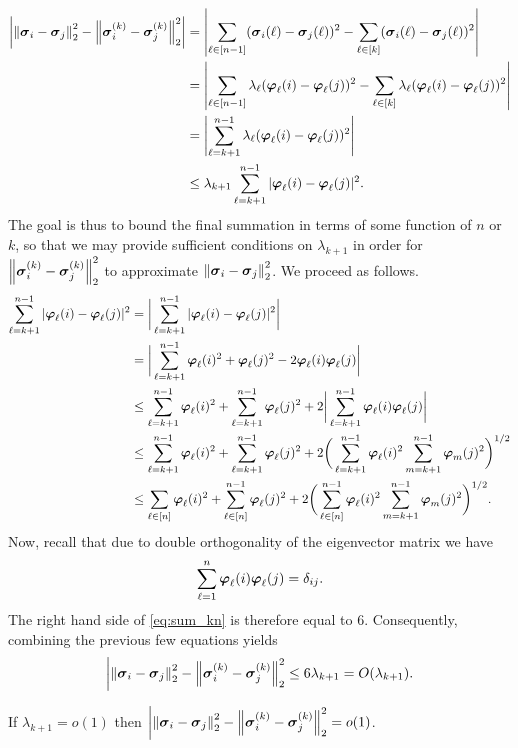 \begin{align*}
\bigg| \norm{\vb*{\sigma}_i-\vb*{\sigma}_j}_2^2 - \norm{\vb*{\sigma}_i^{(k)}-\vb*{\sigma}_j^{(k)}}_2^2  \bigg| &= \left| \sum_{\ell\in[n-1]} (\vb*{\sigma}_i(\ell)-\vb*{\sigma}_j(\ell))^2  - \sum_{\ell\in[k]}(\vb*{\sigma}_i(\ell) - \vb*{\sigma}_j(\ell))^2 \right|\\ 
&= \left| \sum_{\ell\in[n-1]} \lambda_\ell(\vb*{\varphi}_\ell(i)-\vb*{\varphi}_\ell(j))^2  - \sum_{\ell\in[k]}\lambda_\ell(\vb*{\varphi}_\ell(i) - \vb*{\varphi}_\ell(j))^2 \right|\\ 
&=\left| \sum_{\ell=k+1}^{n-1} \lambda_\ell(\vb*{\varphi}_\ell(i)-\vb*{\varphi}_\ell(j))^2 \right|\\ 
&\leq \lambda_{k+1} \sum_{\ell=k+1}^{n-1} |\vb*{\varphi}_\ell(i)-\vb*{\varphi}_\ell(j)|^2.
\end{align*}
The  goal is  thus to bound the final summation in  terms of some function of $n$ or $k$, so that we may provide sufficient conditions on $\lambda_{k+1}$ in order for $\norm{\vb*{\sigma}_i^{(k)}-\vb*{\sigma}_j^{(k)}}_2^2$ to approximate $\norm{\vb*{\sigma}_i-\vb*{\sigma}_j}_2^2$. We proceed as follows. 
\begin{align}
\sum_{\ell=k+1}^{n-1} |\vb*{\varphi}_\ell(i)-\vb*{\varphi}_\ell(j)|^2 &= \bigg|\sum_{\ell=k+1}^{n-1} |\vb*{\varphi}_\ell(i)-\vb*{\varphi}_\ell(j)|^2\bigg| \notag \\
&= \bigg|\sum_{\ell={k+1}}^{n-1} \vb*{\varphi}_\ell(i)^2 + \vb*{\varphi}_\ell(j)^2 - 2\vb*{\varphi}_\ell(i)\vb*{\varphi}_\ell(j) \bigg|\notag \\
&\leq \sum_{\ell=k+1}^{n-1} \vb*{\varphi}_\ell(i)^2 + \sum_{\ell=k+1}^{n-1} \vb*{\varphi}_\ell(j)^2 + 2\bigg|\sum_{\ell=k+1}^{n-1} \vb*{\varphi}_\ell(i)\vb*{\varphi}_\ell(j)\bigg| \notag  \\
&\leq \sum_{\ell=k+1}^{n-1} \vb*{\varphi}_\ell(i)^2 + \sum_{\ell=k+1}^{n-1} \vb*{\varphi}_\ell(j)^2 + 2\bigg(\sum_{\ell=k+1}^{n-1}\vb*{\varphi}_\ell(i)^2\sum_{m=k+1}^{n-1}\vb*{\varphi}_m(j)^2\bigg) ^{1/2} \notag \\
&\leq \sum_{\ell\in[n]} \vb*{\varphi}_\ell(i)^2 + \sum_{\ell\in[n]}^{n-1} \vb*{\varphi}_\ell(j)^2 + 2\bigg(\sum_{\ell\in[n]}^{n-1}\vb*{\varphi}_\ell(i)^2\sum_{m=k+1}^{n-1}\vb*{\varphi}_m(j)^2\bigg) ^{1/2}. \label{eq:sum_kn}
\end{align} 
Now,  recall that due to double orthogonality of the eigenvector matrix we  have \[\sum_{\ell=1}^n \vb*{\varphi}_\ell(i)\vb*{\varphi}_\ell(j) = \delta_{ij}.\]  The right  hand side of \eqref{eq:sum_kn} is therefore  equal to 6. Consequently, combining the previous few equations yields 
\begin{equation*}
\bigg| \norm{\vb*{\sigma}_i-\vb*{\sigma}_j}_2^2 - \norm{\vb*{\sigma}_i^{(k)}-\vb*{\sigma}_j^{(k)}}_2^2\leq 6\lambda_{k+1}=O(\lambda_{k+1}). 
\end{equation*}

\begin{lemma}
	If $\lambda_{k+1}=o(1)$ then $\bigg| \norm{\vb*{\sigma}_i-\vb*{\sigma}_j}_2^2 - \norm{\vb*{\sigma}_i^{(k)}-\vb*{\sigma}_j^{(k)}}_2^2= o(1)$. 
\end{lemma}


